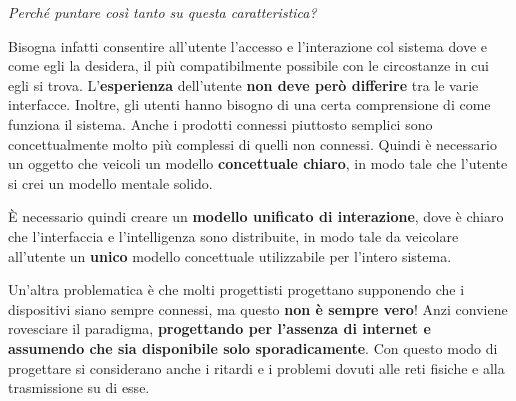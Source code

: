 \begin{flushleft}
	\textit{Perché puntare così tanto su
		questa caratteristica?}
\end{flushleft}

Bisogna infatti consentire all'utente l'accesso e l'interazione col sistema dove e come egli la desidera, il più compatibilmente possibile con le circostanze in cui egli si trova. L'\textbf{esperienza} dell'utente \textbf{non deve però differire} tra le varie interfacce. Inoltre, gli utenti hanno bisogno di una certa comprensione di come funziona il sistema. Anche i prodotti connessi piuttosto semplici sono concettualmente molto più complessi di quelli non connessi. Quindi è necessario un oggetto che veicoli un modello \textbf{concettuale chiaro}, in modo tale che l'utente si crei un modello mentale solido.

È necessario quindi creare un
\textbf{modello unificato di interazione}, dove è chiaro che l'interfaccia e l'intelligenza sono distribuite, in modo tale da veicolare all'utente un \textbf{unico} modello concettuale utilizzabile per l'intero sistema.

Un'altra problematica è che molti progettisti progettano supponendo che i dispositivi siano sempre connessi, ma questo \textbf{non è sempre vero}! Anzi conviene rovesciare il paradigma, \textbf{progettando per l'assenza di internet e assumendo che sia disponibile solo sporadicamente}. Con questo modo di progettare si considerano anche i ritardi e i problemi dovuti alle reti fisiche e alla trasmissione su di esse.

